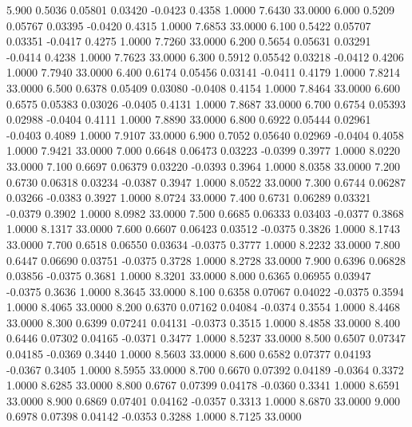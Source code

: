    5.900   0.5036   0.05801   0.03420  -0.0423   0.4358   1.0000   7.6430  33.0000
   6.000   0.5209   0.05767   0.03395  -0.0420   0.4315   1.0000   7.6853  33.0000
   6.100   0.5422   0.05707   0.03351  -0.0417   0.4275   1.0000   7.7260  33.0000
   6.200   0.5654   0.05631   0.03291  -0.0414   0.4238   1.0000   7.7623  33.0000
   6.300   0.5912   0.05542   0.03218  -0.0412   0.4206   1.0000   7.7940  33.0000
   6.400   0.6174   0.05456   0.03141  -0.0411   0.4179   1.0000   7.8214  33.0000
   6.500   0.6378   0.05409   0.03080  -0.0408   0.4154   1.0000   7.8464  33.0000
   6.600   0.6575   0.05383   0.03026  -0.0405   0.4131   1.0000   7.8687  33.0000
   6.700   0.6754   0.05393   0.02988  -0.0404   0.4111   1.0000   7.8890  33.0000
   6.800   0.6922   0.05444   0.02961  -0.0403   0.4089   1.0000   7.9107  33.0000
   6.900   0.7052   0.05640   0.02969  -0.0404   0.4058   1.0000   7.9421  33.0000
   7.000   0.6648   0.06473   0.03223  -0.0399   0.3977   1.0000   8.0220  33.0000
   7.100   0.6697   0.06379   0.03220  -0.0393   0.3964   1.0000   8.0358  33.0000
   7.200   0.6730   0.06318   0.03234  -0.0387   0.3947   1.0000   8.0522  33.0000
   7.300   0.6744   0.06287   0.03266  -0.0383   0.3927   1.0000   8.0724  33.0000
   7.400   0.6731   0.06289   0.03321  -0.0379   0.3902   1.0000   8.0982  33.0000
   7.500   0.6685   0.06333   0.03403  -0.0377   0.3868   1.0000   8.1317  33.0000
   7.600   0.6607   0.06423   0.03512  -0.0375   0.3826   1.0000   8.1743  33.0000
   7.700   0.6518   0.06550   0.03634  -0.0375   0.3777   1.0000   8.2232  33.0000
   7.800   0.6447   0.06690   0.03751  -0.0375   0.3728   1.0000   8.2728  33.0000
   7.900   0.6396   0.06828   0.03856  -0.0375   0.3681   1.0000   8.3201  33.0000
   8.000   0.6365   0.06955   0.03947  -0.0375   0.3636   1.0000   8.3645  33.0000
   8.100   0.6358   0.07067   0.04022  -0.0375   0.3594   1.0000   8.4065  33.0000
   8.200   0.6370   0.07162   0.04084  -0.0374   0.3554   1.0000   8.4468  33.0000
   8.300   0.6399   0.07241   0.04131  -0.0373   0.3515   1.0000   8.4858  33.0000
   8.400   0.6446   0.07302   0.04165  -0.0371   0.3477   1.0000   8.5237  33.0000
   8.500   0.6507   0.07347   0.04185  -0.0369   0.3440   1.0000   8.5603  33.0000
   8.600   0.6582   0.07377   0.04193  -0.0367   0.3405   1.0000   8.5955  33.0000
   8.700   0.6670   0.07392   0.04189  -0.0364   0.3372   1.0000   8.6285  33.0000
   8.800   0.6767   0.07399   0.04178  -0.0360   0.3341   1.0000   8.6591  33.0000
   8.900   0.6869   0.07401   0.04162  -0.0357   0.3313   1.0000   8.6870  33.0000
   9.000   0.6978   0.07398   0.04142  -0.0353   0.3288   1.0000   8.7125  33.0000
